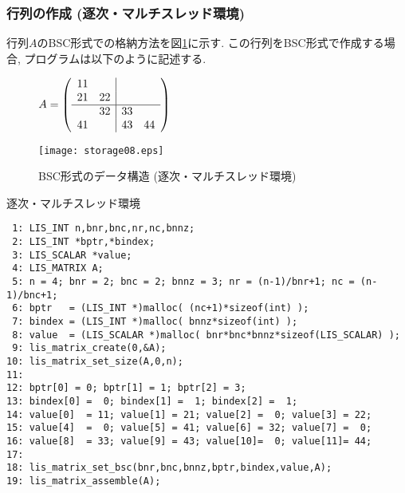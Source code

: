 \documentclass[a4paper]{jarticle}
\begin{document}
{{\subsubsection{行列の作成 (逐次・マルチスレッド環境)}
行列$A$のBSC形式での格納方法を図\ref{fig:storage08}に示す. 
この行列をBSC形式で作成する場合, プログラムは以下のように記述する. 
\begin{figure}[h]
{\centering 
\begin{minipage}{0.3\textwidth}
\begin{flushright}
$ 
A = \left(
\begin{array}{cc|cc}
11 &    &    &    \\
21 & 22 &    &    \\ \hline
   & 32 & 33 &    \\
41 &    & 43 & 44 \\
\end{array}\right)
$
\end{flushright}
\end{minipage}
\begin{minipage}{0.6\textwidth}
\begin{flushleft}
\texttt{[image: storage08.eps]} 
\end{flushleft}
\end{minipage}
\caption{BSC形式のデータ構造 (逐次・マルチスレッド環境)}\label{fig:storage08}}
\end{figure}
\begin{itembox}[l]{逐次・マルチスレッド環境}
\small
\begin{verbatim}
 1: LIS_INT n,bnr,bnc,nr,nc,bnnz;
 2: LIS_INT *bptr,*bindex;
 3: LIS_SCALAR *value;
 4: LIS_MATRIX A;
 5: n = 4; bnr = 2; bnc = 2; bnnz = 3; nr = (n-1)/bnr+1; nc = (n-1)/bnc+1;
 6: bptr   = (LIS_INT *)malloc( (nc+1)*sizeof(int) );
 7: bindex = (LIS_INT *)malloc( bnnz*sizeof(int) );
 8: value  = (LIS_SCALAR *)malloc( bnr*bnc*bnnz*sizeof(LIS_SCALAR) );
 9: lis_matrix_create(0,&A);
10: lis_matrix_set_size(A,0,n);
11:
12: bptr[0] = 0; bptr[1] = 1; bptr[2] = 3;
13: bindex[0] =  0; bindex[1] =  1; bindex[2] =  1;
14: value[0]  = 11; value[1] = 21; value[2] =  0; value[3] = 22;
15: value[4]  =  0; value[5] = 41; value[6] = 32; value[7] =  0;
16: value[8]  = 33; value[9] = 43; value[10]=  0; value[11]= 44;
17:
18: lis_matrix_set_bsc(bnr,bnc,bnnz,bptr,bindex,value,A);
19: lis_matrix_assemble(A);
\end{verbatim}
\end{itembox}

\newpage
}}
\end{document}
